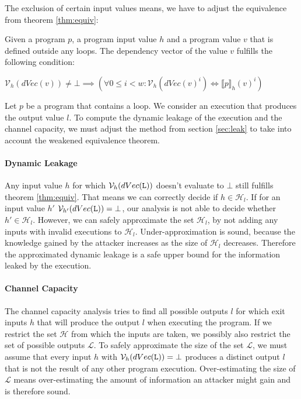 The exclusion of certain input values means, we have to adjust the equivalence from theorem \ref{thm:equiv}:

\begin{theorem}\label{thm:weak}
    Given a program $p$, a program input value $h$ and a program value $v$ that is defined outside any loops. The dependency vector of the value $v$ fulfills the following condition:
    \begin{center}
        $\mathcal{V}_h(dVec(v)) \neq \bot \implies ( \forall 0 \leq i < w: \mathcal{V}_h(dVec(v)^i) \iff \llbracket p \rrbracket_h (v)^i)$
    \end{center}
\end{theorem}

Let $p$ be a program that contains a loop. We consider an execution that produces the output value $l$.
To compute the dynamic leakage of the execution and the channel capacity, we must adjust the method from section \ref{sec:leak} to take into account the weakened equivalence theorem.

\paragraph{Dynamic Leakage}
Any input value $h$ for which $\mathcal{V}_h(dVec(\mathtt{L}))$ doesn't evaluate to $\bot$ still fulfills theorem \ref{thm:equiv}. That means we can correctly decide if $h \in \mathcal{H}_l$. If for an input value $h'$ $\mathcal{V}_{h'}(dVec(\mathtt{L})) = \bot$, our analysis is not able to decide whether $h' \in \mathcal{H}_l$. However, we can safely approximate the set $\mathcal{H}_l$, by not adding any inputs with invalid executions to $\mathcal{H}_l$. Under-approximation is sound, because the knowledge gained by the attacker increases as the size of $\mathcal{H}_l$ decreases. Therefore the approximated dynamic leakage is a safe upper bound for the information leaked by the execution.

\paragraph{Channel Capacity}
The channel capacity analysis tries to find all possible outputs $l$ for which exit inputs $h$ that will produce the output $l$ when executing the program. If we restrict the set $\mathcal{H}$ from which the inputs are taken, we possibly also restrict the set of possible outputs $\mathcal{L}$. To safely approximate the size of the set $\mathcal{L}$, we must assume that every input $h$ with $\mathcal{V}_h(dVec(\mathtt{L})) = \bot$ produces a distinct output $l$ that is not the result of any other program execution. Over-estimating the size of $\mathcal{L}$ means over-estimating the amount of information an attacker might gain and is therefore sound.


